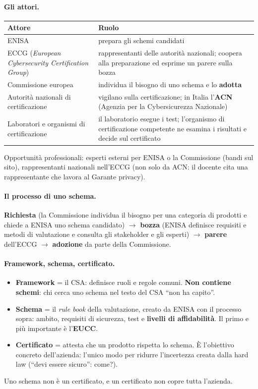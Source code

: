 \paragraph{Gli attori.}
\begin{center}
\small
\begin{tabularx}{\linewidth}{>{\raggedright\arraybackslash}p{4.2cm} X}
\toprule
\textbf{Attore} & \textbf{Ruolo}\\
\midrule
ENISA & prepara gli schemi candidati\\
ECCG (\emph{European Cybersecurity Certification Group}) & rappresentanti delle autorità nazionali;
  coopera alla preparazione ed esprime un parere sulla bozza\\
Commissione europea & individua il bisogno di uno schema e lo \textbf{adotta}\\
Autorità nazionali di certificazione & vigilano sulla certificazione; in Italia l'\textbf{ACN} (Agenzia per la
  Cybersicurezza Nazionale)\\
Laboratori e organismi di certificazione & il laboratorio esegue i test; l'organismo di certificazione
  competente ne esamina i risultati e decide sul certificato\\
\bottomrule
\end{tabularx}
\end{center}
Opportunità professionali: esperti esterni per ENISA o la Commissione (bandi sul sito), rappresentanti
nazionali nell'ECCG (non solo da ACN: il docente cita una rappresentante che lavora al Garante privacy).

\paragraph{Il processo di uno schema.} \textbf{Richiesta} (la Commissione individua il bisogno per una
categoria di prodotti e chiede a ENISA uno schema candidato) $\rightarrow$ \textbf{bozza} (ENISA definisce
requisiti e metodi di valutazione e consulta gli stakeholder e gli esperti) $\rightarrow$
\textbf{parere} dell'ECCG $\rightarrow$ \textbf{adozione} da parte della Commissione.

\paragraph{Framework, schema, certificato.}
\begin{itemize}
  \item \textbf{Framework} = il CSA: definisce ruoli e regole comuni. \textbf{Non contiene schemi}: chi cerca
    uno schema nel testo del CSA ``non ha capito''.
  \item \textbf{Schema} = il \emph{rule book} della valutazione, creato da ENISA con il processo sopra:
    ambito, requisiti di sicurezza, test e \textbf{livelli di affidabilità}. Il primo e più importante è
    l'\textbf{EUCC}.
  \item \textbf{Certificato} = attesta che un prodotto rispetta lo schema. È l'obiettivo concreto
    dell'azienda: l'unico modo per ridurre l'incertezza creata dalla hard law (``devi essere sicuro'': come?).
\end{itemize}
Uno schema non è un certificato, e un certificato non copre tutta l'azienda.

